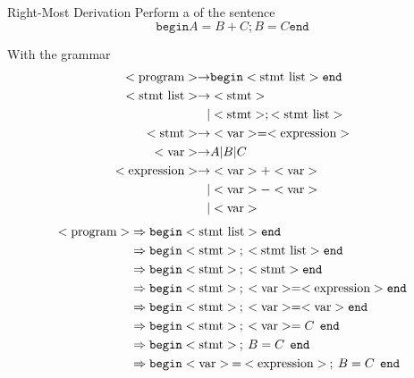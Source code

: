 \begin{example}[]{Right-Most Derivation}
  Perform a  of the sentence
  \begin{equation*}
    \mathtt{begin} A = B + C ; B = C \mathtt{end}
  \end{equation*}

  With the grammar
  \begin{align*}
    <\text{program}> \rightarrow &\mathtt{begin} <\text{stmt list}> \mathtt{end} \\
    <\text{stmt list}> \rightarrow &<\text{stmt}> \\
                          \vert &<\text{stmt}> ; <\text{stmt list}> \\
    <\text{stmt}> \rightarrow &<\text{var}> = <\text{expression}> \\
    <\text{var}> \rightarrow &A \vert B \vert C \\
    <\text{expression}> \rightarrow &<\text{var}> + <\text{var}> \\
                          \vert &<\text{var}> - <\text{var}> \\
                          \vert &<\text{var}>
  \end{align*}
  \tcblower{}
  \begin{align*}
    \Nonterminal{program} &\Rightarrow \mathtt{begin} \Nonterminal{stmt list} \mathtt{end} \\
                          &\Rightarrow \mathtt{begin} \Nonterminal{stmt}\: ; \: \Nonterminal{stmt list} \mathtt{end} \\
                          &\Rightarrow \mathtt{begin} \Nonterminal{stmt} \: ; \: \Nonterminal{stmt} \mathtt{end} \\
                          &\Rightarrow \mathtt{begin} \Nonterminal{stmt} \: ; \: \Nonterminal{var} = \Nonterminal{expression} \mathtt{end} \\
                          &\Rightarrow \mathtt{begin} \Nonterminal{stmt} \: ; \: \Nonterminal{var} = \Nonterminal{var} \mathtt{end} \\
                          &\Rightarrow \mathtt{begin} \Nonterminal{stmt} \: ; \: \Nonterminal{var} = C \:\: \mathtt{end} \\
                          &\Rightarrow \mathtt{begin} \Nonterminal{stmt} \: ; \: B = C \:\: \mathtt{end} \\
                          &\Rightarrow \mathtt{begin} \Nonterminal{var} \: = \: \Nonterminal{expression} \: ; \: B = C \:\: \mathtt{end} \\

\end{align*}
\end{example}
